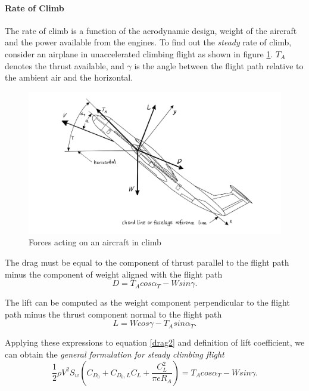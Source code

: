 \documentclass[letterpaper,12pt]{article}
\begin{document}
\paragraph{Rate of Climb}
The rate of climb is a function of the aerodynamic design, weight of the aircraft and the power available from the engines. To find out the \textit{steady} rate of climb, consider an airplane in unaccelerated climbing flight as shown in figure \ref{forces-climb}. $T_A$ denotes the thrust available, and $\gamma$ is the angle between the flight path relative to the ambient air and the horizontal.
\begin{figure}[H]
\includegraphics[scale=0.4]{forces_climb}
\centering
\caption{Forces acting on an aircraft in climb}
\label{forces-climb}
\end{figure}

The drag must be equal to the component of thrust parallel to the flight path minus the component of weight aligned with the flight path
\begin{equation}
D=T_Acos\alpha_T-Wsin\gamma.
\label{drag-climb}
\end{equation}

The lift can be computed as the weight component perpendicular to the flight path minus the thrust component normal to the flight path
\begin{equation}
L=Wcos\gamma-T_Asin\alpha_T.
\end{equation}

Applying these expressions to equation \ref{drag2} and definition of lift coefficient, we can obtain the \textit{general formulation for steady climbing flight}
\begin{equation}
\frac{1}{2}\rho V^2S_w\left(C_{D_0}+C_{{D_0},L}C_L+\frac{C_L^2}{\pi eR_A}\right)=T_Acos\alpha_T-Wsin\gamma.
\end{equation}
\end{document}
